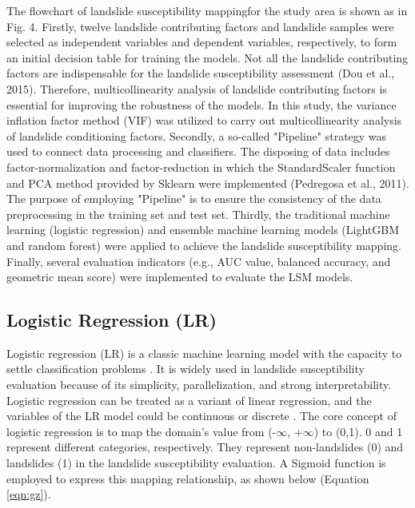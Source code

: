\documentclass[a4paper,fleqn]{cas-sc}
\begin{document}
The flowchart of landslide susceptibility mappingfor the study area is shown as in Fig. 4. 
Firstly, twelve landslide contributing factors and landslide samples were selected as independent variables and dependent variables, respectively, to form an initial decision table for training the models. 
Not all the landslide contributing factors are indispensable for the landslide susceptibility assessment (Dou et al., 2015). 
Therefore, multicollinearity analysis of landslide contributing factors is essential for improving the robustness of the models. 
In this study, the variance inflation factor method (VIF) was utilized to carry out multicollinearity analysis of landslide conditioning factors. 
Secondly, a so-called "Pipeline" strategy was used to connect data processing and classifiers. 
The disposing of data includes factor-normalization and factor-reduction in which the StandardScaler function and PCA method provided by Sklearn were implemented (Pedregosa et al., 2011). 
The purpose of employing "Pipeline" is to ensure the consistency of the data preprocessing in the training set and test set. 
Thirdly, the traditional machine learning (logistic regression) and ensemble machine learning models (LightGBM and random forest) were applied to achieve the landslide susceptibility mapping. 
Finally, several evaluation indicators (e.g., AUC value, balanced accuracy, and geometric mean score) were implemented to evaluate the LSM models.


\subsection{Logistic Regression (LR)}

Logistic regression (LR) is a classic machine learning model with the capacity to settle classification problems \citep{Ayalew2005Geomorphology,Bai2010Geomorphology,Song2018}. 
It is widely used in landslide susceptibility evaluation because of its simplicity, parallelization, and strong interpretability. 
Logistic regression can be treated as a variant of linear regression, and the variables of the LR model could be continuous or discrete \citep{Ayalew2005Geomorphology,Bai2010Geomorphology}. 
The core concept of logistic regression is to map the domain's value from (-$\infty$, +$\infty$) to (0,1). 
0 and 1 represent different categories, respectively. 
They represent non-landslides (0) and landslides (1) in the landslide susceptibility evaluation. 
A Sigmoid function is employed to express this mapping relationship, as shown below (Equation \ref{eqn:gz}).
\end{document}
